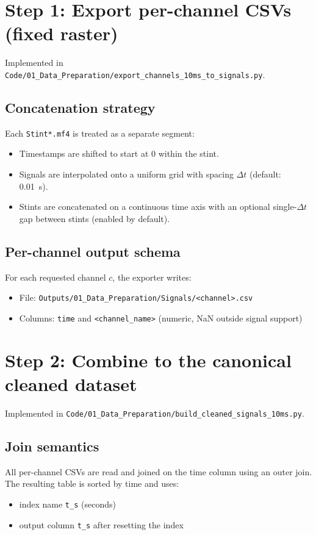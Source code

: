 \documentclass[11pt,a4paper]{article}
\begin{document}
\section{Step 1: Export per-channel CSVs (fixed raster)}
Implemented in \texttt{Code/01\_Data\_Preparation/export\_channels\_10ms\_to\_signals.py}.

\subsection*{Concatenation strategy}
Each \texttt{Stint*.mf4} is treated as a separate segment:
\begin{itemize}
  \item Timestamps are shifted to start at 0 within the stint.
  \item Signals are interpolated onto a uniform grid with spacing $\Delta t$ (default: \SI{0.01}{s}).
  \item Stints are concatenated on a continuous time axis with an optional single-$\Delta t$ gap between stints (enabled by default).
\end{itemize}

\subsection*{Per-channel output schema}
For each requested channel $c$, the exporter writes:
\begin{itemize}
  \item File: \texttt{Outputs/01\_Data\_Preparation/Signals/<channel>.csv}
  \item Columns: \texttt{time} and \texttt{<channel\_name>} (numeric, NaN outside signal support)
\end{itemize}

\section{Step 2: Combine to the canonical cleaned dataset}
Implemented in \texttt{Code/01\_Data\_Preparation/build\_cleaned\_signals\_10ms.py}.

\subsection*{Join semantics}
All per-channel CSVs are read and joined on the time column using an outer join.
The resulting table is sorted by time and uses:
\begin{itemize}
  \item index name \texttt{t\_s} (seconds)
  \item output column \texttt{t\_s} after resetting the index
\end{itemize}
\end{document}
